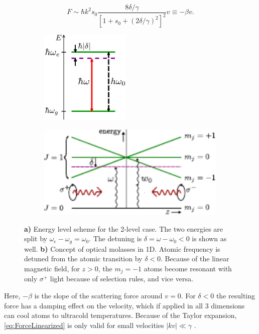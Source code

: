 \begin{equation}\label{eq:ForceLinearized}
	F \sim \hbar k^2 s_0 \frac{8\delta/\gamma}{\left[1+s_0+(2\delta/\gamma)^2\right]^2} v 
	\equiv -\beta v.
\end{equation}
\begin{figure}
\centering
	\begin{subfigure}{.38\textwidth}
		\centering
		\includegraphics[height=4.5cm]{figures/2LevelAtom.pdf}
		\caption{}
		\label{fig:2LevelAtom}
	\end{subfigure}
	\begin{subfigure}{.61\textwidth}
		\centering
		\includegraphics[height=4.5cm]{figures/Molasses.pdf}
		\caption{}
		\label{fig:MOTPlots}
	\end{subfigure}
	\caption{\textbf{\textsf{a)}} Energy level scheme for the 2-level case. 
	The two energies are split by $\omega_e - \omega_g = \omega_0$.
	The detuning is $\delta = \omega-\omega_0<0$ is shown as well.
	\textbf{\textsf{b)}} Concept of optical molasses in 1D. 
	Atomic frequency is detuned from the atomic transition by $\delta<0$.
	Because of the linear magnetic field, for $z>0$, the $m_j=-1$ atoms become resonant with only $\sigma^+$ light because of selection rules, and vice versa.}
\end{figure}
Here, $-\beta$ is the slope of the scattering force around $v=0$. 
For $\delta<0$ the resulting force has a damping effect on the velocity, which if applied in all 3 dimensions can cool atoms to ultracold temperatures. 
Because of the Taylor expansion, \cref{eq:ForceLinearized} is only valid for small velocities $|kv| \ll \gamma$ \cite{Kowalski2010}.

